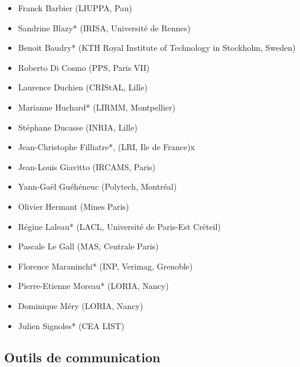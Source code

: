 \documentclass[11pt]{article}
\begin{document}
\begin{itemize}
    \item Franck Barbier (LIUPPA, Pau)
    \item Sandrine Blazy*  (IRISA, Université de Rennes)
    \item Benoit Baudry* (KTH Royal Institute of Technology in Stockholm, Sweden)
    \item Roberto Di Cosmo (PPS, Paris VII)
    \item Laurence Duchien (CRIStAL, Lille)
    \item Marianne Huchard* (LIRMM, Montpellier)
    \item  Stéphane Ducasse (INRIA, Lille)
    \item Jean-Christophe Filliatre*, (LRI, Ile de France)x
    \item Jean-Louis Giavitto (IRCAMS, Paris)
    \item Yann-Gaël Guéhéneuc (Polytech, Montréal)
    \item Olivier Hermant (Mines Paris)
    \item Régine Laleau* (LACL, Université de Paris-Est Créteil)
    \item Pascale Le Gall (MAS, Centrale Paris)
    \item Florence  Maraninchi* (INP, Verimag, Grenoble)
    \item Pierre-Etienne Moreau* (LORIA, Nancy)
   \item Dominique Méry (LORIA, Nancy)
    \item Julien Signoles* (CEA LIST)
 \end{itemize}   

 \medskip

 \noindent

\subsection{Outils de communication}

\end{document}
